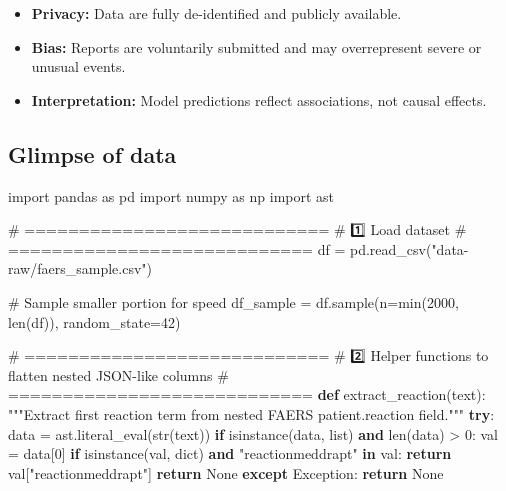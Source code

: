 \documentclass[
  letterpaper,
  DIV=11,
  numbers=noendperiod]{scrartcl}
\newenvironment{Shaded}{\begin{snugshade}}{\end{snugshade}}
\newcommand{\BuiltInTok}[1]{\textcolor[rgb]{0.00,0.23,0.31}{#1}}
\newcommand{\CommentTok}[1]{\textcolor[rgb]{0.37,0.37,0.37}{#1}}
\newcommand{\ControlFlowTok}[1]{\textcolor[rgb]{0.00,0.23,0.31}{\textbf{#1}}}
\newcommand{\DecValTok}[1]{\textcolor[rgb]{0.68,0.00,0.00}{#1}}
\newcommand{\ImportTok}[1]{\textcolor[rgb]{0.00,0.46,0.62}{#1}}
\newcommand{\KeywordTok}[1]{\textcolor[rgb]{0.00,0.23,0.31}{\textbf{#1}}}
\newcommand{\NormalTok}[1]{\textcolor[rgb]{0.00,0.23,0.31}{#1}}
\newcommand{\OperatorTok}[1]{\textcolor[rgb]{0.37,0.37,0.37}{#1}}
\newcommand{\PreprocessorTok}[1]{\textcolor[rgb]{0.68,0.00,0.00}{#1}}
\newcommand{\StringTok}[1]{\textcolor[rgb]{0.13,0.47,0.30}{#1}}
\newcommand{\VariableTok}[1]{\textcolor[rgb]{0.07,0.07,0.07}{#1}}
\begin{document}
\begin{itemize}
\item
  \textbf{Privacy:} Data are fully de-identified and publicly available.
\item
  \textbf{Bias:} Reports are voluntarily submitted and may overrepresent
  severe or unusual events.
\item
  \textbf{Interpretation:} Model predictions reflect associations, not
  causal effects.
\end{itemize}

\subsection{Glimpse of data}\label{glimpse-of-data}

\begin{Shaded}
\begin{Highlighting}[]
\ImportTok{import}\NormalTok{ pandas }\ImportTok{as}\NormalTok{ pd}
\ImportTok{import}\NormalTok{ numpy }\ImportTok{as}\NormalTok{ np}
\ImportTok{import}\NormalTok{ ast}

\CommentTok{\# ============================}
\CommentTok{\# 1️⃣ Load dataset}
\CommentTok{\# ============================}
\NormalTok{df }\OperatorTok{=}\NormalTok{ pd.read\_csv(}\StringTok{"data{-}raw/faers\_sample.csv"}\NormalTok{)}

\CommentTok{\# Sample smaller portion for speed}
\NormalTok{df\_sample }\OperatorTok{=}\NormalTok{ df.sample(n}\OperatorTok{=}\BuiltInTok{min}\NormalTok{(}\DecValTok{2000}\NormalTok{, }\BuiltInTok{len}\NormalTok{(df)), random\_state}\OperatorTok{=}\DecValTok{42}\NormalTok{)}


\CommentTok{\# ============================}
\CommentTok{\# 2️⃣ Helper functions to flatten nested JSON{-}like columns}
\CommentTok{\# ============================}
\KeywordTok{def}\NormalTok{ extract\_reaction(text):}
    \CommentTok{"""Extract first reaction term from nested FAERS \textquotesingle{}patient.reaction\textquotesingle{} field."""}
    \ControlFlowTok{try}\NormalTok{:}
\NormalTok{        data }\OperatorTok{=}\NormalTok{ ast.literal\_eval(}\BuiltInTok{str}\NormalTok{(text))}
        \ControlFlowTok{if} \BuiltInTok{isinstance}\NormalTok{(data, }\BuiltInTok{list}\NormalTok{) }\KeywordTok{and} \BuiltInTok{len}\NormalTok{(data) }\OperatorTok{\textgreater{}} \DecValTok{0}\NormalTok{:}
\NormalTok{            val }\OperatorTok{=}\NormalTok{ data[}\DecValTok{0}\NormalTok{]}
            \ControlFlowTok{if} \BuiltInTok{isinstance}\NormalTok{(val, }\BuiltInTok{dict}\NormalTok{) }\KeywordTok{and} \StringTok{"reactionmeddrapt"} \KeywordTok{in}\NormalTok{ val:}
                \ControlFlowTok{return}\NormalTok{ val[}\StringTok{"reactionmeddrapt"}\NormalTok{]}
        \ControlFlowTok{return} \VariableTok{None}
    \ControlFlowTok{except} \PreprocessorTok{Exception}\NormalTok{:}
        \ControlFlowTok{return} \VariableTok{None}



\end{Highlighting}
\end{Shaded}
\end{document}
